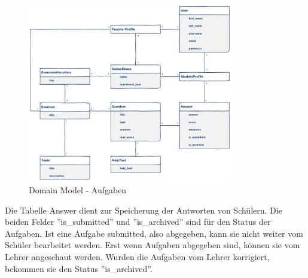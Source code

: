 \begin{figure}[H]
\begin{center}
	\includegraphics[width=0.8\textwidth, keepaspectratio]{images/domain_model_exercise.png}
	\caption{Domain Model - Aufgaben}
	\label{fig:domain_model_exercise}
\end{center}
\end{figure}

Die Tabelle Answer dient zur Speicherung der Antworten von Schülern. Die beiden Felder ''is\_submitted'' und ''is\_archived'' sind für den Status der Aufgaben. Ist eine Aufgabe submitted, also abgegeben, kann sie nicht weiter vom Schüler bearbeitet werden. Erst wenn Aufgaben abgegeben sind, können sie vom Lehrer angeschaut werden. Wurden die Aufgaben vom Lehrer korrigiert, bekommen sie den Status ''is\_archived''.

\newpage
